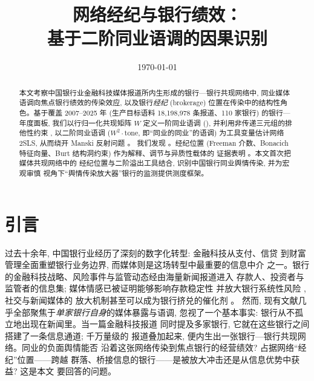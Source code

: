 




\title{网络经纪与银行绩效：\\基于二阶同业语调的因果识别}
\author{}
\date{\today}


\maketitle

\begin{abstract}
本文考察中国银行业金融科技媒体报道所内生形成的银行—银行共现网络中,
同业媒体语调向焦点银行绩效的传染效应, 以及银行\emph{经纪}
(brokerage) 位置在传染中的结构性角色。基于覆盖 2007--2025 年
(生产目标语料 18{,}198{,}978 条报道、110 家银行) 的银行—年度面板,
我们以行归一化共现矩阵 $W$ 定义一阶同业语调
(), 并利用非传递三元组的排他性约束
\parencite{bramoulle2009identification}, 以二阶同业语调
($W^{2}\cdot\text{tone}$, 即``同业的同业''的语调) 为工具变量估计网络
2SLS, 从而绕开 Manski 反射问题 \parencite{manski1993reflection}。
我们发现 。经纪位置 (Freeman
介数、Bonacich 特征向量、Burt 结构洞约束) 作为解释、调节与异质性载体的
证据表明 。本文首次把媒体共现网络中的
经纪位置与二阶溢出工具结合, 识别中国银行同业舆情传染, 并为宏观审慎
视角下``舆情传染放大器''银行的监测提供测度框架。
\end{abstract}

\section{引言}\label{sec:intro}

过去十余年, 中国银行业经历了深刻的数字化转型: 金融科技从支付、信贷
到财富管理全面重塑银行业务边界, 而媒体则是这场转型中最重要的信息中介
之一。银行的金融科技战略、风险事件与监管动态经由海量新闻报道进入
存款人、投资者与监管者的信息集; 媒体情感已被证明能够影响存款稳定性
并放大银行系统性风险 \parencite{fang2024media}, 社交与新闻媒体的
放大机制甚至可以成为银行挤兑的催化剂 \parencite{cookson2026social}。
然而, 现有文献几乎全部聚焦于\emph{单家银行自身}的媒体暴露与语调,
忽视了一个基本事实: 银行从不孤立地出现在新闻里。当一篇金融科技报道
同时提及多家银行, 它就在这些银行之间搭建了一条信息通道; 千万量级的
报道叠加起来, 便内生出一张银行—银行共现网络。同业的负面舆情能否
沿着这张网络传染到焦点银行的经营绩效? 占据网络``经纪''位置——跨越
群落、桥接信息的银行——是被放大冲击还是从信息优势中获益? 这是本文
要回答的问题。


